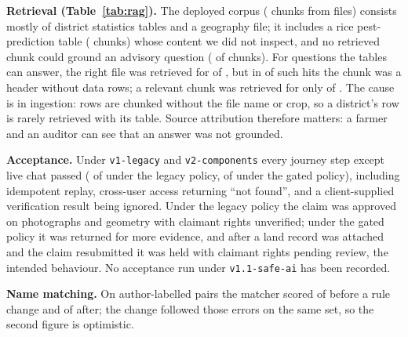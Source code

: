 \documentclass{ieeeaccess}
\begin{document}
\textbf{Retrieval (Table~\ref{tab:rag}).} The deployed corpus (\RagCorpusChunks{} chunks from \RagCorpusFiles{} files) consists mostly of district statistics tables and a geography file; it includes a rice pest-prediction table (\RagPestTableChunks{} chunks) whose content we did not inspect, and no retrieved chunk could ground an advisory question (\RagAdvisoryAnswerBearing{} of \RagAdvisoryChunks{} chunks). For questions the tables can answer, the right file was retrieved for \RagAnswerableExpectedFile{} of \RagAnswerableQueries{}, but in \RagHeaderOnlyHits{} of \RagExpectedFileHits{} such hits the chunk was a header without data rows; a relevant chunk was retrieved for only \RagAnswerableRelevantHits{} of \RagAnswerableQueries{}. The cause is in ingestion: rows are chunked without the file name or crop, so a district's row is rarely retrieved with its table. Source attribution therefore matters: a farmer and an auditor can see that an answer was not grounded.

\textbf{Acceptance.} Under \texttt{v1-legacy} and \texttt{v2-components} every journey step except live chat passed (\AcceptanceLegacyPassed{} of \AcceptanceLegacyTotal{} under the legacy policy, \AcceptanceGatedPassed{} of \AcceptanceGatedTotal{} under the gated policy), including idempotent replay, cross-user access returning ``not found'', and a client-supplied verification result being ignored. Under the legacy policy the claim was approved on photographs and geometry with claimant rights unverified; under the gated policy it was returned for more evidence, and after a land record was attached and the claim resubmitted it was held with claimant rights pending review, the intended behaviour. No acceptance run under \texttt{v1.1-safe-ai} has been recorded.

\textbf{Name matching.} On \NamesPairs{} author-labelled pairs the matcher scored \NamesCorrectBeforeTuning{} of \NamesPairs{} before a rule change and \NamesCorrectAfterTuning{} of \NamesPairs{} after; the change followed those errors on the same set, so the second figure is optimistic.
\end{document}
